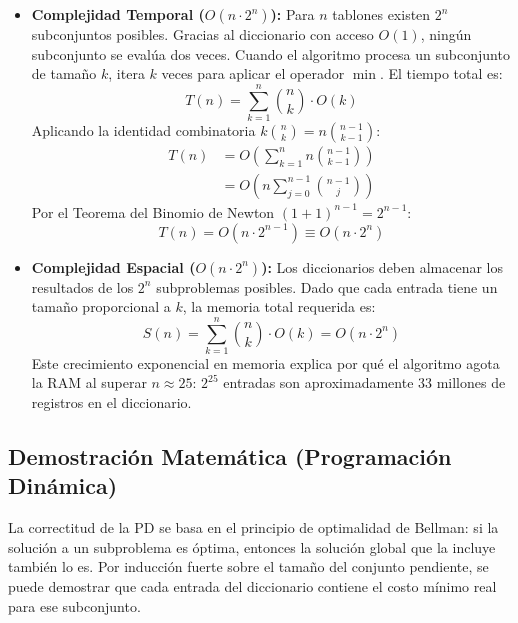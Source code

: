 \documentclass[conference, a4paper]{IEEEtran}
\begin{document}
\begin{itemize}
    \item \textbf{Complejidad Temporal ($O(n \cdot 2^n)$):} Para $n$ tablones existen $2^n$ subconjuntos posibles. Gracias al diccionario con acceso $O(1)$, ningún subconjunto se evalúa dos veces. Cuando el algoritmo procesa un subconjunto de tamaño $k$, itera $k$ veces para aplicar el operador $\min$. El tiempo total es:
    \begin{equation}
    T(n) = \sum_{k=1}^{n} \binom{n}{k} \cdot O(k)
    \end{equation}
    Aplicando la identidad combinatoria $k\binom{n}{k} = n\binom{n-1}{k-1}$:
    \begin{align*}
    T(n) &= O\left( \sum_{k=1}^{n} n \binom{n-1}{k-1} \right) \\
         &= O\left( n \sum_{j=0}^{n-1} \binom{n-1}{j} \right)
    \end{align*}
    Por el Teorema del Binomio de Newton $(1+1)^{n-1} = 2^{n-1}$:
    \begin{equation}
    T(n) = O\left(n \cdot 2^{n-1}\right) \equiv O(n \cdot 2^n)
    \end{equation}
    
    \item \textbf{Complejidad Espacial ($O(n \cdot 2^n)$):} Los diccionarios deben almacenar los resultados de los $2^n$ subproblemas posibles. Dado que cada entrada tiene un tamaño proporcional a $k$, la memoria total requerida es:
    \begin{equation}
    S(n) = \sum_{k=1}^{n} \binom{n}{k} \cdot O(k) = O(n \cdot 2^n)
    \end{equation}
    Este crecimiento exponencial en memoria explica por qué el algoritmo agota la RAM al superar $n \approx 25$: $2^{25}$ entradas son aproximadamente 33 millones de registros en el diccionario.
\end{itemize}

\subsection{Demostración Matemática (Programación Dinámica)}

La correctitud de la PD se basa en el principio de optimalidad de Bellman: si la solución a un subproblema es óptima, entonces la solución global que la incluye también lo es. Por inducción fuerte sobre el tamaño del conjunto pendiente, se puede demostrar que cada entrada del diccionario contiene el costo mínimo real para ese subconjunto.
\end{document}
